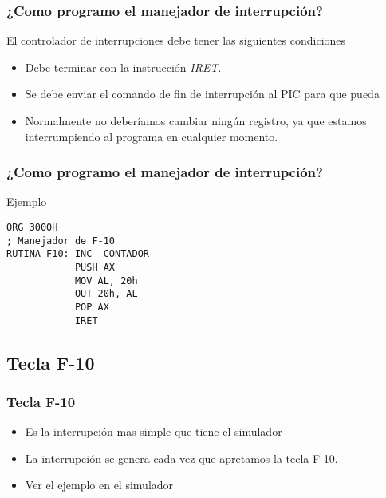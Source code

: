 \documentclass{beamer}
\begin{document}
\begin{frame}[fragile]
\frametitle{¿Como programo el manejador de interrupción?}
El controlador de interrupciones debe tener las siguientes condiciones
\begin{itemize} 
 \item Debe terminar con la instrucción \emph{IRET}.
 \item Se debe enviar el comando de fin de interrupción al PIC para que pueda 
 \item Normalmente no deberíamos cambiar ningún registro, ya que estamos interrumpiendo al programa en cualquier momento.
\end{itemize}
\end{frame}

\begin{frame}[fragile]
\frametitle{¿Como programo el manejador de interrupción?}
\begin{block}{Ejemplo}
\begin{verbatim}
ORG 3000H
; Manejador de F-10
RUTINA_F10: INC  CONTADOR
            PUSH AX
            MOV AL, 20h
            OUT 20h, AL
            POP AX
            IRET
\end{verbatim}
\end{block}

\end{frame}


\subsection{Tecla F-10}
\begin{frame}
\frametitle{Tecla F-10}
\begin{itemize}
 \item Es la interrupción mas simple que tiene el simulador
 \item La interrupción se genera cada vez que apretamos la tecla F-10.
 \item Ver el ejemplo en el simulador
\end{itemize}

\end{frame}
\end{document}
